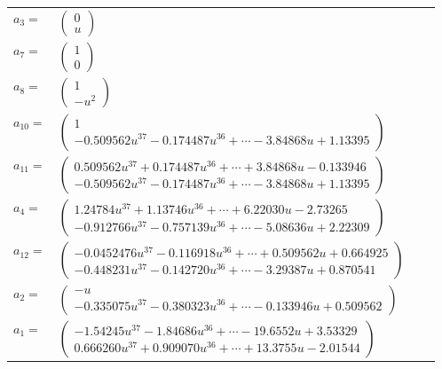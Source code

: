 \documentclass[1p]{elsarticle_modified}
\theoremstyle{definition}
\begin{document}
\begin{tabular}{m{7pt} m{180pt} m{7pt} m{180pt} }
\flushright $a_{3}=$&$\begin{pmatrix}0\\u\end{pmatrix}$ \\
\flushright $a_{7}=$&$\begin{pmatrix}1\\0\end{pmatrix}$ \\
\flushright $a_{8}=$&$\begin{pmatrix}1\\- u^2\end{pmatrix}$ \\
\flushright $a_{10}=$&$\begin{pmatrix}1\\-0.509562 u^{37}-0.174487 u^{36}+\cdots-3.84868 u+1.13395\end{pmatrix}$ \\
\flushright $a_{11}=$&$\begin{pmatrix}0.509562 u^{37}+0.174487 u^{36}+\cdots+3.84868 u-0.133946\\-0.509562 u^{37}-0.174487 u^{36}+\cdots-3.84868 u+1.13395\end{pmatrix}$ \\
\flushright $a_{4}=$&$\begin{pmatrix}1.24784 u^{37}+1.13746 u^{36}+\cdots+6.22030 u-2.73265\\-0.912766 u^{37}-0.757139 u^{36}+\cdots-5.08636 u+2.22309\end{pmatrix}$ \\
\flushright $a_{12}=$&$\begin{pmatrix}-0.0452476 u^{37}-0.116918 u^{36}+\cdots+0.509562 u+0.664925\\-0.448231 u^{37}-0.142720 u^{36}+\cdots-3.29387 u+0.870541\end{pmatrix}$ \\
\flushright $a_{2}=$&$\begin{pmatrix}- u\\-0.335075 u^{37}-0.380323 u^{36}+\cdots-0.133946 u+0.509562\end{pmatrix}$ \\
\flushright $a_{1}=$&$\begin{pmatrix}-1.54245 u^{37}-1.84686 u^{36}+\cdots-19.6552 u+3.53329\\0.666260 u^{37}+0.909070 u^{36}+\cdots+13.3755 u-2.01544\end{pmatrix}$ \\

\end{tabular}
\end{document}
